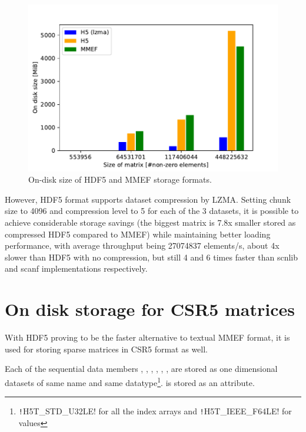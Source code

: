 \documentclass[thesis=M,english]{FITthesis}[2019/12/23]
\newcommand{\csre}[1]{\texttt!#1!}
\begin{document}
\begin{figure}[htp]
    \centering
    \includegraphics[scale=0.7]{static/mmef_vs_h5_stor.pdf}
    \caption{On-disk size of HDF5 and MMEF storage formats.}\label{impl:stor:size}
\end{figure}

However, HDF5 format supports dataset compression by LZMA. Setting chunk size to 4096 and compression level to 5 for each of the 3 datasets,
it is possible to achieve considerable storage savings (the biggest matrix is 7.8x smaller stored as compressed HDF5 compared to MMEF)
while maintaining better loading performance, with average throughput being \num{27074837} elements/s, about 4x slower than HDF5 with no compression,
but still 4 and 6 times faster than scnlib and scanf implementations respectively.


\section{On disk storage for CSR5 matrices}\label{csr5:onDisk}

With HDF5 proving to be the faster alternative to textual MMEF format, it is used for storing sparse
matrices in CSR5 format as well.

Each of the sequential data members , , , ,
, , are stored as one dimensional datasets of same name
and same datatype\footnote{\csre{H5T_STD_U32LE} for all the index arrays and \csre{H5T_IEEE_F64LE} for values}.
 is stored as an attribute.
\end{document}
